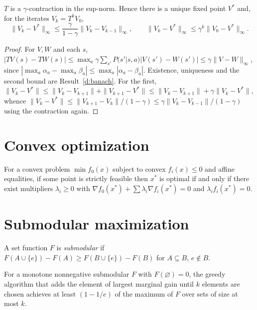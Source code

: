 \begin{newresult}\label{e:bellman}
$T$ is a $\gamma$-contraction in the sup-norm. Hence there is a unique fixed point $V^*$ and, for the iterates $V_k=T^kV_0$,
\[
\|V_k-V^*\|_\infty\le\frac{\gamma}{1-\gamma}\|V_k-V_{k-1}\|_\infty,\qquad \|V_k-V^*\|_\infty\le\gamma^k\|V_0-V^*\|_\infty .
\]
\end{newresult}
\begin{proof}
For $V,W$ and each $s$, $|TV(s)-TW(s)|\le\max_a\gamma\sum_{s'}P(s'|s,a)|V(s')-W(s')|\le\gamma\|V-W\|_\infty$, since $|\max_a\alpha_a-\max_a\beta_a|\le\max_a|\alpha_a-\beta_a|$. Existence, uniqueness and the second bound are Result~\ref{d:banach}. For the first, $\|V_k-V^*\|\le\|V_k-V_{k+1}\|+\|V_{k+1}-V^*\|\le\|V_k-V_{k+1}\|+\gamma\|V_k-V^*\|$, whence $\|V_k-V^*\|\le\|V_{k+1}-V_k\|/(1-\gamma)\le\gamma\|V_k-V_{k-1}\|/(1-\gamma)$ using the contraction again.
\end{proof}

\section{Convex optimization}

\begin{established}\label{e:kkt}
For a convex problem $\min f_0(x)$ subject to convex $f_i(x)\le0$ and affine equalities, if some point is strictly feasible then $x^*$ is optimal if and only if there exist multipliers $\lambda_i\ge0$ with $\nabla f_0(x^*)+\sum\lambda_i\nabla f_i(x^*)=0$ and $\lambda_if_i(x^*)=0$.
\end{established}

\section{Submodular maximization}

A set function $F$ is \emph{submodular} if $F(A\cup\{e\})-F(A)\ge F(B\cup\{e\})-F(B)$ for $A\subseteq B$, $e\notin B$.

\begin{established}\label{e:greedy}
For a monotone nonnegative submodular $F$ with $F(\varnothing)=0$, the greedy algorithm that adds the element of largest marginal gain until $k$ elements are chosen achieves at least $(1-1/e)$ of the maximum of $F$ over sets of size at most $k$.
\end{established}

